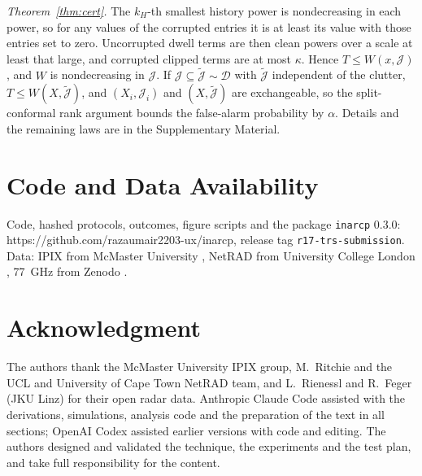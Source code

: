 \documentclass[journal]{IEEEtran}
\begin{document}
\emph{Theorem~\ref{thm:cert}.} The $k_H$-th smallest history power is nondecreasing in each power, so for any values of the corrupted entries it is at least its value with those entries set to zero. Uncorrupted dwell terms are then clean powers over a scale at least that large, and corrupted clipped terms are at most $\kappa$. Hence $T\le W(x,\mathcal J)$, and $W$ is nondecreasing in $\mathcal J$. If $\mathcal J\subseteq\tilde{\mathcal J}\sim\mathcal D$ with $\tilde{\mathcal J}$ independent of the clutter, $T\le W(X,\tilde{\mathcal J})$, and $(X_i,\mathcal J_i)$ and $(X,\tilde{\mathcal J})$ are exchangeable, so the split-conformal rank argument bounds the false-alarm probability by $\alpha$. Details and the remaining laws are in the Supplementary Material.

\section*{Code and Data Availability}
Code, hashed protocols, outcomes, figure scripts and the package \texttt{inarcp} 0.3.0: https://github.com/razaumair2203-ux/inarcp, release tag \texttt{r17-trs-submission}. Data: IPIX from McMaster University \cite{ipixweb}, NetRAD from University College London \cite{netrad2026}, 77~GHz from Zenodo \cite{jku2026}.

\section*{Acknowledgment}
The authors thank the McMaster University IPIX group, M.~Ritchie and the UCL and University of Cape Town NetRAD team, and L.~Rienessl and R.~Feger (JKU Linz) for their open radar data. Anthropic Claude Code assisted with the derivations, simulations, analysis code and the preparation of the text in all sections; OpenAI Codex assisted earlier versions with code and editing. The authors designed and validated the technique, the experiments and the test plan, and take full responsibility for the content.



\end{document}
